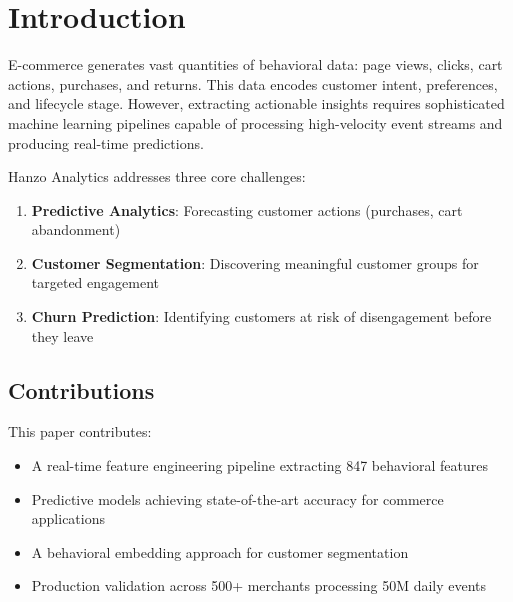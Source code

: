 \section{Introduction}


E-commerce generates vast quantities of behavioral data: page views, clicks, cart actions, purchases, and returns. This data encodes customer intent, preferences, and lifecycle stage. However, extracting actionable insights requires sophisticated machine learning pipelines capable of processing high-velocity event streams and producing real-time predictions.

Hanzo Analytics addresses three core challenges:

\begin{enumerate}
    \item \textbf{Predictive Analytics}: Forecasting customer actions (purchases, cart abandonment)
    \item \textbf{Customer Segmentation}: Discovering meaningful customer groups for targeted engagement
    \item \textbf{Churn Prediction}: Identifying customers at risk of disengagement before they leave
\end{enumerate}

\subsection{Contributions}

This paper contributes:

\begin{itemize}
    \item A real-time feature engineering pipeline extracting 847 behavioral features
    \item Predictive models achieving state-of-the-art accuracy for commerce applications
    \item A behavioral embedding approach for customer segmentation
    \item Production validation across 500+ merchants processing 50M daily events
\end{itemize}

